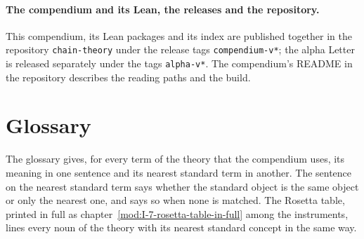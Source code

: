 \paragraph{The compendium and its Lean, the releases and the repository.} This compendium, its Lean packages and its index are published together in the repository \texttt{chain-theory} under the release tags \texttt{compendium-v*}; the alpha Letter is released separately under the tags \texttt{alpha-v*}. The compendium's README in the repository describes the reading paths and the build.
\section*{Glossary}\label{app:glossary}
The glossary gives, for every term of the theory that the compendium uses, its meaning in one sentence and its nearest standard term in another. The sentence on the nearest standard term says whether the standard object is the same object or only the nearest one, and says so when none is matched. The Rosetta table, printed in full as chapter~\ref{mod:I-7-rosetta-table-in-full} among the instruments, lines every noun of the theory with its nearest standard concept in the same way.
